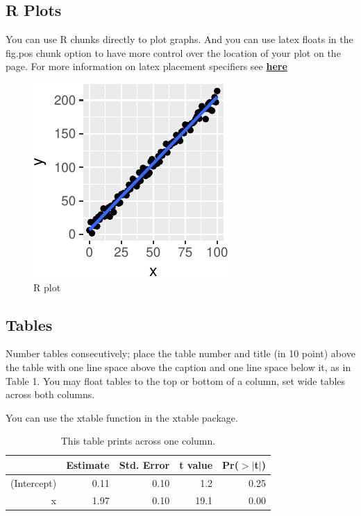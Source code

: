 \documentclass[10pt, letterpaper]{article}
\newenvironment{CodeChunk}{}{}
\begin{document}
\subsection{R Plots}\label{r-plots}

You can use R chunks directly to plot graphs. And you can use latex
floats in the fig.pos chunk option to have more control over the
location of your plot on the page. For more information on latex
placement specifiers see
\textbf{\href{https://en.wikibooks.org/wiki/LaTeX/Floats,_Figures_and_Captions}{here}}

\begin{CodeChunk}
\begin{figure}[H]

{\centering \includegraphics{figs/plot-1} 

}

\caption[R plot]{R plot}\label{fig:plot}
\end{figure}
\end{CodeChunk}

\subsection{Tables}\label{tables}

Number tables consecutively; place the table number and title (in 10
point) above the table with one line space above the caption and one
line space below it, as in Table 1. You may float tables to the top or
bottom of a column, set wide tables across both columns.

You can use the xtable function in the xtable package.

\begin{table}[H]
\centering
\begin{tabular}{rrrrr}
  \hline
 & Estimate & Std. Error & t value & Pr($>$$|$t$|$) \\ 
  \hline
(Intercept) & 0.11 & 0.10 & 1.2 & 0.25 \\ 
  x & 1.97 & 0.10 & 19.1 & 0.00 \\ 
   \hline
\end{tabular}
\caption{This table prints across one column.} 
\end{table}
\end{document}
